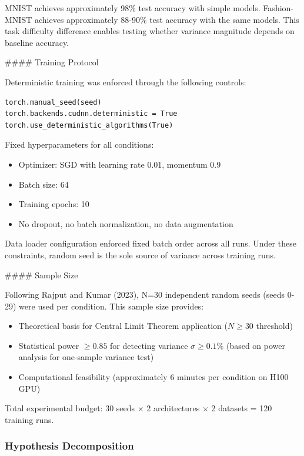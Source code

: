 MNIST achieves approximately 98\% test accuracy with simple models. Fashion-MNIST achieves approximately 88-90\% test accuracy with the same models. This task difficulty difference enables testing whether variance magnitude depends on baseline accuracy.

\#\#\#\# Training Protocol

Deterministic training was enforced through the following controls:

\begin{verbatim}
torch.manual_seed(seed)
torch.backends.cudnn.deterministic = True
torch.use_deterministic_algorithms(True)
\end{verbatim}

Fixed hyperparameters for all conditions:
\begin{itemize}
\item Optimizer: SGD with learning rate 0.01, momentum 0.9
\item Batch size: 64
\item Training epochs: 10
\item No dropout, no batch normalization, no data augmentation
\end{itemize}

Data loader configuration enforced fixed batch order across all runs. Under these constraints, random seed is the sole source of variance across training runs.

\#\#\#\# Sample Size

Following Rajput and Kumar (2023), N=30 independent random seeds (seeds 0-29) were used per condition. This sample size provides:
\begin{itemize}
\item Theoretical basis for Central Limit Theorem application ($N\geq 30$ threshold)
\item Statistical power $\geq 0.85$ for detecting variance $\sigma \geq 0.1$\% (based on power analysis for one-sample variance test)
\item Computational feasibility (approximately 6 minutes per condition on H100 GPU)
\end{itemize}

Total experimental budget: 30 seeds $\times$ 2 architectures $\times$ 2 datasets = 120 training runs.

\subsubsection{Hypothesis Decomposition}

